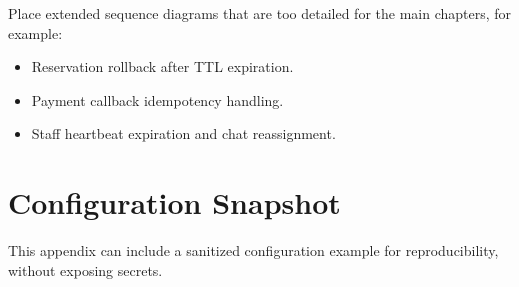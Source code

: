Place extended sequence diagrams that are too detailed for the main chapters, for example:
\begin{itemize}
    \item Reservation rollback after TTL expiration.
    \item Payment callback idempotency handling.
    \item Staff heartbeat expiration and chat reassignment.
\end{itemize}

\section{Configuration Snapshot}

This appendix can include a sanitized configuration example for reproducibility, without exposing secrets.
